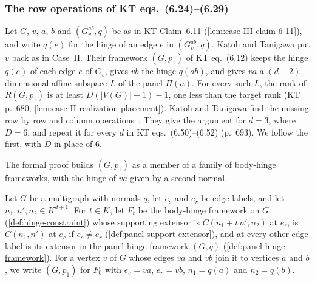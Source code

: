 \subsubsection{The row operations of KT eqs.\ (6.24)--(6.29)}
\label{sec:molecular-algebraic-induction-candidate-completion}

Let $G$, $v$, $a$, $b$ and $(G_v^{ab}, q)$ be as in KT Claim~6.11
(\cref{lem:case-III-claim-6-11}), and write $q(e)$ for the hinge of an
edge $e$ in $(G_v^{ab}, q)$. Katoh and Tanigawa put $v$ back as in
Case~II. Their framework $(G, p_1)$ of KT eq.~(6.12) keeps the hinge
$q(e)$ of each edge $e$ of $G_v$, gives $vb$ the hinge $q(ab)$, and gives
$va$ a $(d-2)$-dimensional affine subspace $L$ of the panel $\Pi(a)$.
For every such $L$, the rank of $R(G, p_1)$ is at least
$D(|V(G)| - 1) - 1$, one less than the target rank (KT p.~680;
\cref{lem:case-II-realization-placement}). Katoh and Tanigawa find the
missing row by row and column
operations~\cite[pp.~685--686]{katohTanigawa2011}. They give the argument for
$d = 3$, where $D = 6$, and repeat it for every $d$ in KT
eqs.~(6.50)--(6.52) (p.~693). We follow the first, with $D$ in place
of $6$.

The formal proof builds $(G, p_1)$ as a member of a family of
body-hinge frameworks, with the hinge of $va$ given by a second normal.

\begin{definition}
  \label{def:case-III-candidate}
  \leanok
  Let $G$ be a multigraph with normals $q$, let $e_c$ and $e_r$ be edge
  labels, and let $n_1, n', n_2 \in K^{d+1}$. For $t \in K$, let $F_t$
  be the body-hinge framework on $G$ (\cref{def:hinge-constraint}) whose
  supporting extensor is $C(n_1 + t\,n', n_2)$ at $e_r$, is
  $C(n_1, n')$ at $e_c$ if $e_c \neq e_r$
  (\cref{def:panel-support-extensor}), and at every other edge label is
  its extensor in the panel-hinge framework $(G, q)$
  (\cref{def:panel-hinge-framework}). For a vertex $v$ of $G$ whose
  edges $va$ and $vb$ join it to vertices $a$ and $b$, we write
  $(G, p_1)$ for $F_0$ with $e_c = va$, $e_r = vb$, $n_1 = q(a)$ and
  $n_2 = q(b)$.
\end{definition}

